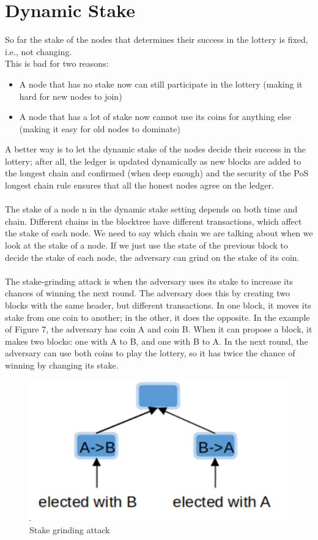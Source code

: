 \section{Dynamic Stake}
So far the stake of the nodes that determines their success in the lottery is fixed, i.e., not changing. \\
This is bad for two reasons:
\begin{itemize}
    \item A node that has no stake now can still participate in the lottery (making it hard for new nodes to join)
    \item A node that has a lot of stake now cannot use its coins for anything else (making it easy for old nodes to dominate)
\end{itemize}
A better way is to let the dynamic stake of the nodes decide their success in the lottery; after all, the ledger is updated dynamically as new blocks are added to the longest chain and confirmed (when deep enough) and the security of the PoS longest chain rule ensures that all the honest nodes agree on the ledger.\\\\
The stake of a node n in the dynamic stake setting depends on both time and chain. Different chains in the blocktree have different transactions, which affect the stake of each node. We need to say which chain we are talking about when we look at the stake of a node. If we just use the state of the previous block to decide the stake of each node, the adversary can grind
on the stake of its coin.\\\\
The stake-grinding attack is when the adversary uses its stake to increase its chances of winning the next round. The adversary does this by creating two blocks with the same header, but different transactions. In one block, it moves its stake from one coin to another; in the other, it does the opposite. In the example of Figure 7, the adversary has coin A and coin B. When it can propose a block, it makes two blocks: one with A to B, and one with B to A. In the next round, the adversary can use both coins to play the lottery, so it has twice the chance of winning by changing its stake.

\begin{figure}[h!]
    \centering
    \includegraphics[width=0.3\linewidth]{Fig/11/F8}
    \caption{Stake grinding attack}
    \label{fig:f8}
\end{figure}


